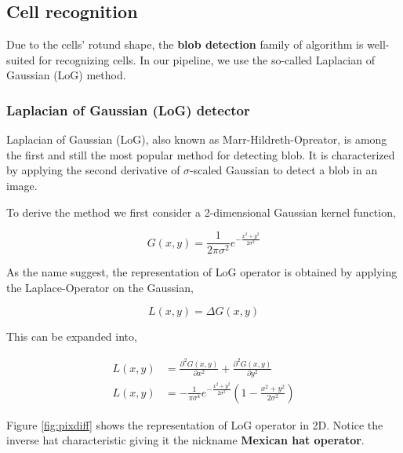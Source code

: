 \documentclass[pdftex,12pt,a4paper]{report}
\begin{document}
\subsection{Cell recognition}
\label{subsection:cell_recognition}

Due to the cells' rotund shape, the \textbf{blob detection} family of algorithm is well-suited for recognizing cells. In our pipeline, we use the so-called Laplacian of Gaussian (LoG) method.

\subsubsection*{Laplacian of Gaussian (LoG) detector}

Laplacian of Gaussian (LoG), also known as Marr-Hildreth-Opreator, is among the first and still the most popular method for detecting blob. It is characterized by applying the second derivative of $\sigma$-scaled Gaussian to detect a blob in an image.

To derive the method we first consider a 2-dimensional Gaussian kernel function,

\begin{equation}
G(x,y) = \frac{1}{{2\pi \sigma^2}} e^{-\frac{x^2 + y^2}{2 \sigma^2}}
\label{equation:gauss_2d_log}
\end{equation}

As the name suggest, the representation of LoG operator is obtained by applying the Laplace-Operator on the Gaussian,

$$
L(x, y) = \Delta G(x, y)
$$

This can be expanded into,

\begin{equation*}
\begin{aligned}
L(x, y) & = \frac{\partial^2 G(x, y)}{\partial x^2} + \frac{\partial^2 G(x, y)}{\partial y^2} \\ 
L(x, y) & = - \frac{1}{\pi \sigma^4} e^{-\frac{x^2 + y^2}{2\sigma^2}} \left( 1 - \frac{x^2 + y^2}{2 \sigma^2}\right)
\end{aligned}
\label{eq:svm_hard_margin}
\end{equation*}

Figure \ref{fig:pixdiff} shows the representation of LoG operator in 2D. Notice the inverse hat characteristic giving it the nickname \textbf{Mexican hat operator}.
\end{document}
